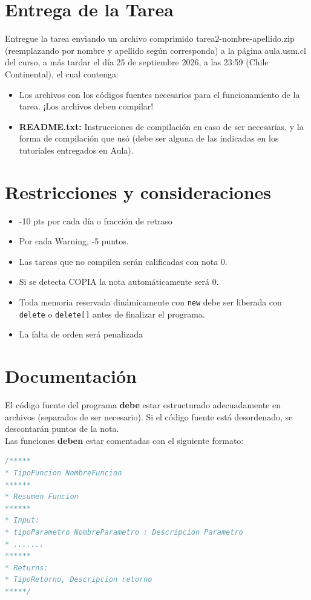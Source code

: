 \documentclass[11pt, letterpaper]{article}
\begin{document}
\section{Entrega de la Tarea}
Entregue la tarea enviando un archivo comprimido tarea2-nombre-apellido.zip (reemplazando por 
nombre y apellido según corresponda) a la página aula.usm.cl del curso, a más tardar el día 25 de 
septiembre 2026, a las 23:59 (Chile Continental), el cual contenga: \\
\begin{itemize}[noitemsep, topsep=0pt]
    \item Los archivos con los códigos fuentes necesarios para el funcionamiento de la tarea. ¡Los 
archivos deben compilar!
    
    \item \textbf{README.txt:} Instrucciones de compilación en caso de ser necesarias, y la forma de 
compilación que usó (debe ser alguna de las indicadas en los tutoriales entregados en 
Aula).
\end{itemize}


\section{Restricciones y consideraciones}
\begin{itemize}[noitemsep, topsep=0pt]
    \item -10 pts por cada día o fracción de
retraso\\
    \item Por cada Warning, -5 puntos.  \\
    \item Las tareas que no compilen serán calificadas con nota 0. \\
    \item Si se detecta COPIA la nota automáticamente será 0.\\
    \item Toda memoria reservada dinámicamente con \texttt{new} debe ser liberada con \texttt{delete} o \texttt{delete[]} antes de finalizar el programa.\\
    \item La falta de orden será penalizada
\end{itemize}

\section{Documentación}
El código fuente del programa \textbf{debe} estar estructurado adecuadamente en archivos (separados de
ser necesario). Si el código fuente está desordenado, se descontarán puntos de la nota.\\
Las funciones \textbf{deben} estar comentadas con el siguiente formato:
\begin{lstlisting}[language=C++]
/*****
* TipoFuncion NombreFuncion
******
* Resumen Funcion
******
* Input:
* tipoParametro NombreParametro : Descripcion Parametro
* .......
******
* Returns:
* TipoRetorno, Descripcion retorno
*****/
\end{lstlisting}
\end{document}
